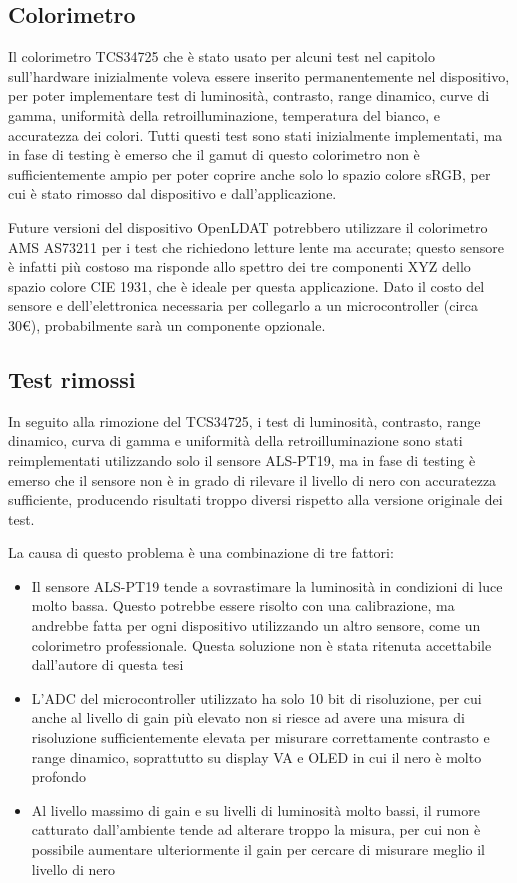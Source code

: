 \subsection{Colorimetro}
Il colorimetro TCS34725 che è stato usato per alcuni test nel capitolo sull'hardware inizialmente voleva essere inserito permanentemente nel dispositivo, per poter implementare test di luminosità, contrasto, range dinamico, curve di gamma, uniformità della retroilluminazione, temperatura del bianco, e accuratezza dei colori. Tutti questi test sono stati inizialmente implementati, ma in fase di testing è emerso che il gamut di questo colorimetro non è sufficientemente ampio per poter coprire anche solo lo spazio colore sRGB, per cui è stato rimosso dal dispositivo e dall'applicazione.

Future versioni del dispositivo OpenLDAT potrebbero utilizzare il colorimetro AMS AS73211 per i test che richiedono letture lente ma accurate; questo sensore è infatti più costoso ma risponde allo spettro dei tre componenti XYZ dello spazio colore CIE 1931, che è ideale per questa applicazione. Dato il costo del sensore e dell'elettronica necessaria per collegarlo a un microcontroller (circa 30€), probabilmente sarà un componente opzionale.

\subsection{Test rimossi}
In seguito alla rimozione del TCS34725, i test di luminosità, contrasto, range dinamico, curva di gamma e uniformità della retroilluminazione sono stati reimplementati utilizzando solo il sensore ALS-PT19, ma in fase di testing è emerso che il sensore non è in grado di rilevare il livello di nero con accuratezza sufficiente, producendo risultati troppo diversi rispetto alla versione originale dei test.

La causa di questo problema è una combinazione di tre fattori:\begin{itemize}
	\item Il sensore ALS-PT19 tende a sovrastimare la luminosità in condizioni di luce molto bassa. Questo potrebbe essere risolto con una calibrazione, ma andrebbe fatta per ogni dispositivo utilizzando un altro sensore, come un colorimetro professionale. Questa soluzione non è stata ritenuta accettabile dall'autore di questa tesi
	\item L'ADC del microcontroller utilizzato ha solo 10 bit di risoluzione, per cui anche al livello di gain più elevato non si riesce ad avere una misura di risoluzione sufficientemente elevata per misurare correttamente contrasto e range dinamico, soprattutto su display VA e OLED in cui il nero è molto profondo
	\item Al livello massimo di gain e su livelli di luminosità molto bassi, il rumore catturato dall'ambiente tende ad alterare troppo la misura, per cui non è possibile aumentare ulteriormente il gain per cercare di misurare meglio il livello di nero
\end{itemize}

